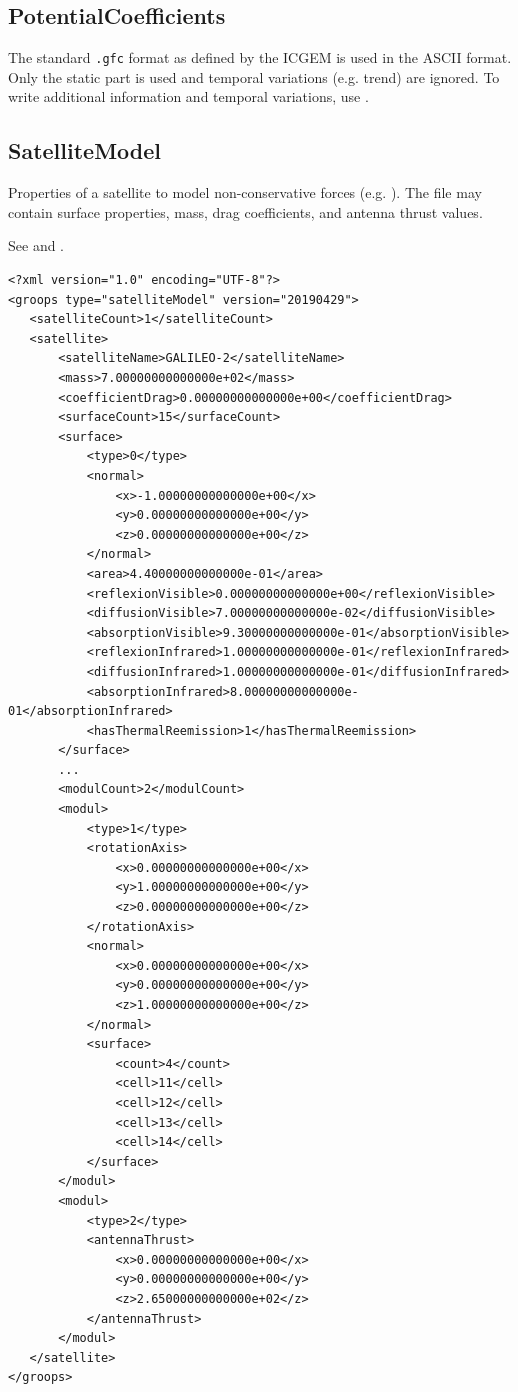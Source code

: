 \subsection{PotentialCoefficients}\label{general.fileFormat:potentialCoefficients}
The standard \verb|.gfc| format as defined by the ICGEM is used in the ASCII format.
Only the static part is used and temporal variations (e.g. trend) are ignored.
To write additional information and temporal variations, use .


\subsection{SatelliteModel}\label{general.fileFormat:satelliteModel}
Properties of a satellite to model non-conservative forces (e.g. ).
The file may contain surface properties, mass, drag coefficients, and antenna thrust values.

See  and .

\begin{verbatim}
<?xml version="1.0" encoding="UTF-8"?>
<groops type="satelliteModel" version="20190429">
   <satelliteCount>1</satelliteCount>
   <satellite>
       <satelliteName>GALILEO-2</satelliteName>
       <mass>7.00000000000000e+02</mass>
       <coefficientDrag>0.00000000000000e+00</coefficientDrag>
       <surfaceCount>15</surfaceCount>
       <surface>
           <type>0</type>
           <normal>
               <x>-1.00000000000000e+00</x>
               <y>0.00000000000000e+00</y>
               <z>0.00000000000000e+00</z>
           </normal>
           <area>4.40000000000000e-01</area>
           <reflexionVisible>0.00000000000000e+00</reflexionVisible>
           <diffusionVisible>7.00000000000000e-02</diffusionVisible>
           <absorptionVisible>9.30000000000000e-01</absorptionVisible>
           <reflexionInfrared>1.00000000000000e-01</reflexionInfrared>
           <diffusionInfrared>1.00000000000000e-01</diffusionInfrared>
           <absorptionInfrared>8.00000000000000e-01</absorptionInfrared>
           <hasThermalReemission>1</hasThermalReemission>
       </surface>
       ...
       <modulCount>2</modulCount>
       <modul>
           <type>1</type>
           <rotationAxis>
               <x>0.00000000000000e+00</x>
               <y>1.00000000000000e+00</y>
               <z>0.00000000000000e+00</z>
           </rotationAxis>
           <normal>
               <x>0.00000000000000e+00</x>
               <y>0.00000000000000e+00</y>
               <z>1.00000000000000e+00</z>
           </normal>
           <surface>
               <count>4</count>
               <cell>11</cell>
               <cell>12</cell>
               <cell>13</cell>
               <cell>14</cell>
           </surface>
       </modul>
       <modul>
           <type>2</type>
           <antennaThrust>
               <x>0.00000000000000e+00</x>
               <y>0.00000000000000e+00</y>
               <z>2.65000000000000e+02</z>
           </antennaThrust>
       </modul>
   </satellite>
</groops>
\end{verbatim}


